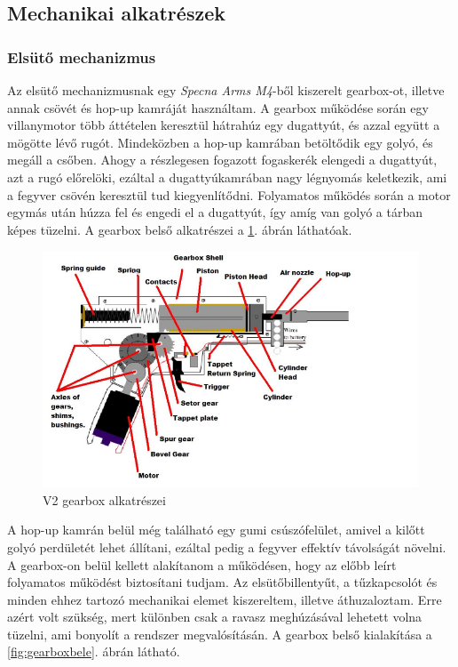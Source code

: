 \documentclass[12pt,a4paper]{article}
\begin{document}
\subsection{Mechanikai alkatrészek}
\subsubsection*{Elsütő mechanizmus}
Az elsütő mechanizmusnak egy \textsl{Specna Arms M4}-ből kiszerelt gearbox-ot, illetve annak csövét és hop-up kamráját használtam. A gearbox működése során egy villanymotor több áttételen keresztül hátrahúz egy dugattyút, és azzal együtt a mögötte lévő rugót. Mindeközben a hop-up kamrában betöltődik egy golyó, és megáll a csőben. Ahogy a részlegesen fogazott fogaskerék elengedi a dugattyút, azt a rugó előrelöki, ezáltal a dugattyúkamrában nagy légnyomás keletkezik, ami a fegyver csövén keresztül tud kiegyenlítődni. Folyamatos működés során a motor egymás után húzza fel és engedi el a dugattyút, így amíg van golyó a tárban képes tüzelni. A gearbox belső alkatrészei a \ref{fig:mech_gearboxdiagram}. ábrán láthatóak. 

\begin{figure}[h!]
	\centering
	\includegraphics[width=1\linewidth]{mech_gearboxdiagram}
	\caption{V2 gearbox alkatrészei}
	\label{fig:mech_gearboxdiagram}
\end{figure}

A hop-up kamrán belül még található egy gumi csúszófelület, amivel a kilőtt golyó perdületét lehet állítani, ezáltal pedig a fegyver effektív távolságát növelni.\\


A gearbox-on belül kellett alakítanom a működésen, hogy az előbb leírt folyamatos működést biztosítani tudjam.  Az elsütőbillentyűt, a tűzkapcsolót és minden ehhez tartozó mechanikai elemet kiszereltem, illetve áthuzaloztam. Erre azért volt szükség, mert különben csak a ravasz meghúzásával lehetett volna tüzelni, ami bonyolít a rendszer megvalósításán. A gearbox belső kialakítása a \ref{fig:gearboxbele}. ábrán látható.
\end{document}
